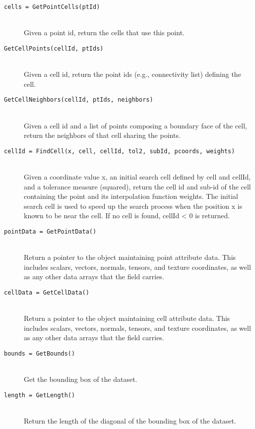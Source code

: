 \begin{description}
\begin{description}
    \item[\texttt{cells = GetPointCells(ptId)}] \hfill \\
    Given a point id, return the cells that use this point.

    \item[\texttt{GetCellPoints(cellId, ptIds)}] \hfill \\
    Given a cell id, return the point ids (e.g., connectivity list) defining the cell.

    \item[\texttt{GetCellNeighbors(cellId, ptIds, neighbors)}] \hfill \\
    Given a cell id and a list of points composing a boundary face of the cell, return the neighbors of that cell sharing the points.

    \item[\texttt{cellId = FindCell(x, cell, cellId, tol2, subId, pcoords, weights)}] \hfill \\
    Given a coordinate value x, an initial search cell defined by cell and cellId, and a tolerance measure (squared), return the cell id and sub-id of the cell containing the point and its interpolation function weights. The initial search cell is used to speed up the search process when the position x is known to be near the cell. If no cell is found, cellId < 0 is returned.

    \item[\texttt{pointData = GetPointData()}] \hfill \\
    Return a pointer to the object maintaining point attribute data. This includes scalars, vectors, normals, tensors, and texture coordinates, as well as any other data arrays that the field carries.

    \item[\texttt{cellData = GetCellData()}] \hfill \\
    Return a pointer to the object maintaining cell attribute data. This includes scalars, vectors, normals, tensors, and texture coordinates, as well as any other data arrays that the field carries.

    \item[\texttt{bounds = GetBounds()}] \hfill \\
    Get the bounding box of the dataset.

    \item[\texttt{length = GetLength()}] \hfill \\
    Return the length of the diagonal of the bounding box of the dataset.


\end{description}
\end{description}
